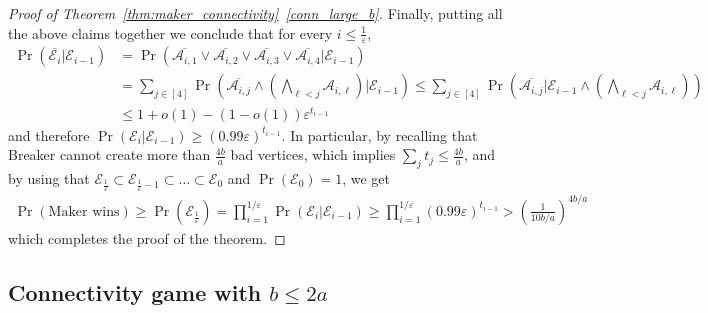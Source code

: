 \documentclass[11pt, a4paper]{article}
\numberwithin{equation}{section}
\numberwithin{figure}{section}
\newcommand{\Prob}{\operatorname{Pr}}
\begin{document}
\begin{proof}[Proof of Theorem~\ref{thm:maker_connectivity}~\ref{conn_large_b}]
Finally, putting all the above claims together 
we conclude that for every $i\leq \frac{1}{\varepsilon}$,
\begin{align*}
\Prob\left(\overline{\mathcal{E}_{i}}|\mathcal{E}_{i-1}\right)
& =
\Prob\left(\overline{\mathcal{A}_{i,1}}\lor \overline{\mathcal{A}_{i,2}}\lor \overline{\mathcal{A}_{i,3}}\lor \overline{\mathcal{A}_{i,4}}|\mathcal{E}_{i-1}\right) \\
& =
\sum_{j\in [4]}
\Prob\left(\overline{\mathcal{A}_{i,j}} \land \left(\bigwedge_{\ell < j} \mathcal{A}_{i,\ell} \right) \Big| \mathcal{E}_{i-1}\right) 
\leq 
\sum_{j\in [4]}
\Prob\left(\overline{\mathcal{A}_{i,j}} \Big| \mathcal{E}_{i-1} \land \left(\bigwedge_{\ell < j} \mathcal{A}_{i,\ell} \right) \right) \\
& \leq
1 + o(1) - (1-o(1))\varepsilon^{t_{i-1}} 
\end{align*}
and therefore
$\Prob\left(\mathcal{E}_{i}|\mathcal{E}_{i-1}\right)
\geq 
(0.99\varepsilon)^{t_{i-1}}$.
In particular, by recalling that Breaker cannot create more than $\frac{4b}{a}$ bad vertices,
which implies $\sum_j t_j \leq \frac{4b}{a}$, and by using that
$\mathcal{E}_{\frac{1}{\varepsilon}}\subset \mathcal{E}_{\frac{1}{\varepsilon}-1} \subset \ldots \subset \mathcal{E}_{0}$ and $\Prob(\mathcal{E}_0)=1$, we get
\begin{align*}
\Prob\left(\text{Maker wins}\right)
\geq 
\Prob\left(\mathcal{E}_{\frac{1}{\varepsilon}}\right)
=
\prod_{i=1}^{1/\varepsilon} \Prob\left(\mathcal{E}_{i}|\mathcal{E}_{i-1}\right) 
\geq
\prod_{i=1}^{1/\varepsilon}
(0.99\varepsilon)^{t_{i-1}}
>
\left(\frac{1}{10 b/a}\right)^{4b/a}
\end{align*}
which completes the proof of the theorem.
\end{proof}






\bigskip


\subsection{Connectivity game with $b\leq 2a$}
\end{document}
